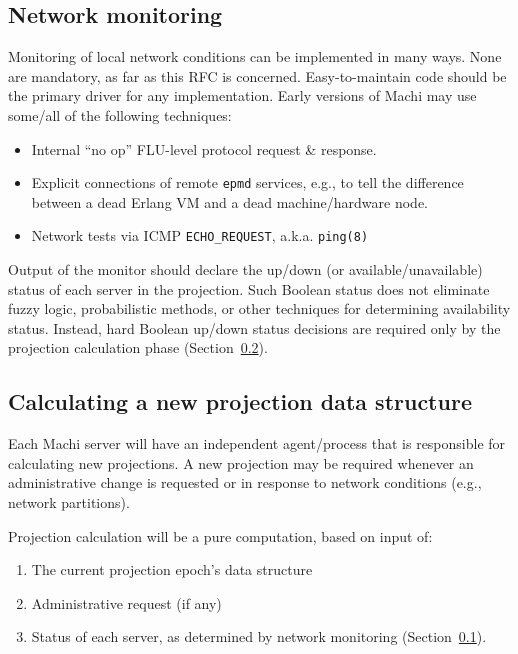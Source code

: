 \documentclass[preprint,10pt]{sigplanconf}
\begin{document}
\subsection{Network monitoring}
\label{sub:network-monitoring}

Monitoring of local network conditions can be implemented in many
ways.  None are mandatory, as far as this RFC is concerned.
Easy-to-maintain code should be the primary driver for any
implementation.  Early versions of Machi may use some/all of the
following techniques:

\begin{itemize}
\item Internal ``no op'' FLU-level protocol request \& response.
\item Explicit connections of remote {\tt epmd} services, e.g., to
tell the difference between a dead Erlang VM and a dead
machine/hardware node.
\item Network tests via ICMP {\tt ECHO\_REQUEST}, a.k.a. {\tt ping(8)}
\end{itemize}

Output of the monitor should declare the up/down (or
available/unavailable) status of each server in the projection.  Such
Boolean status does not eliminate fuzzy logic, probabilistic
methods, or other techniques for determining availability status.
Instead, hard Boolean up/down status
decisions are required only by the projection calculation phase
(Section~\ref{sub:projection-calculation}).

\subsection{Calculating a new projection data structure}
\label{sub:projection-calculation}

Each Machi server will have an independent agent/process that is
responsible for calculating new projections.  A new projection may be
required whenever an administrative change is requested or in response
to network conditions (e.g., network partitions).

Projection calculation will be a pure computation, based on input of:

\begin{enumerate}
\item The current projection epoch's data structure
\item Administrative request (if any)
\item Status of each server, as determined by network monitoring
(Section~\ref{sub:network-monitoring}).
\end{enumerate}
\end{document}
